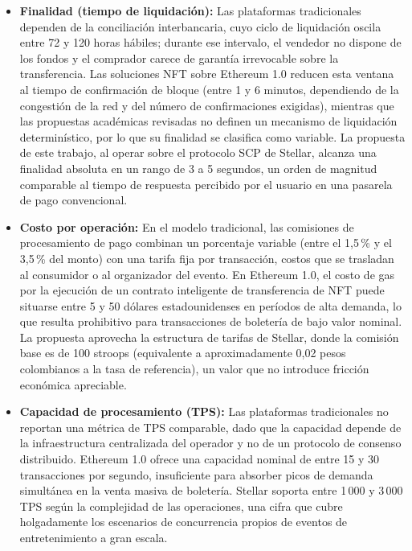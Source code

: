 \begin{itemize}
    \item \textbf{Finalidad (tiempo de liquidación):} Las plataformas tradicionales dependen de la
conciliación interbancaria, 
    cuyo ciclo de liquidación oscila entre 72 y 120 horas hábiles; durante ese intervalo, el vendedor no
dispone de los fondos 
    y el comprador carece de garantía irrevocable sobre la transferencia. Las soluciones NFT sobre Ethereum
1.0 reducen esta 
    ventana al tiempo de confirmación de bloque (entre 1 y 6 minutos, dependiendo de la congestión de la red
y del número de 
    confirmaciones exigidas), mientras que las propuestas académicas revisadas no definen un mecanismo de
liquidación determinístico, 
    por lo que su finalidad se clasifica como variable. La propuesta de este trabajo, al operar sobre el
protocolo SCP de Stellar, 
    alcanza una finalidad absoluta en un rango de 3 a 5 segundos, un orden de magnitud comparable al tiempo
de respuesta percibido 
    por el usuario en una pasarela de pago convencional.

    \item \textbf{Costo por operación:} En el modelo tradicional, las comisiones de procesamiento de pago
combinan un porcentaje 
    variable (entre el 1{,}5\,\% y el 3{,}5\,\% del monto) con una tarifa fija por transacción, costos que se trasladan al 
    consumidor o al organizador del evento. En Ethereum 1.0, el costo de gas por la ejecución de un contrato
inteligente de 
    transferencia de NFT puede situarse entre 5 y 50 dólares estadounidenses en períodos de alta demanda, lo
que resulta 
    prohibitivo para transacciones de boletería de bajo valor nominal. La propuesta aprovecha la estructura
de tarifas de Stellar, 
    donde la comisión base es de 100 stroops (equivalente a aproximadamente 0{,}02 pesos colombianos a la
tasa de referencia), 
    un valor que no introduce fricción económica apreciable.

    \item \textbf{Capacidad de procesamiento (TPS):} Las plataformas tradicionales no reportan una métrica de
TPS comparable, 
    dado que la capacidad depende de la infraestructura centralizada del operador y no de un protocolo de
consenso distribuido. 
    Ethereum 1.0 ofrece una capacidad nominal de entre 15 y 30 transacciones por segundo, insuficiente para
absorber picos de 
    demanda simultánea en la venta masiva de boletería. Stellar soporta entre 1\,000 y 3\,000 TPS según la
complejidad de las 
    operaciones, una cifra que cubre holgadamente los escenarios de concurrencia propios de eventos de
entretenimiento a gran escala.


\end{itemize}
